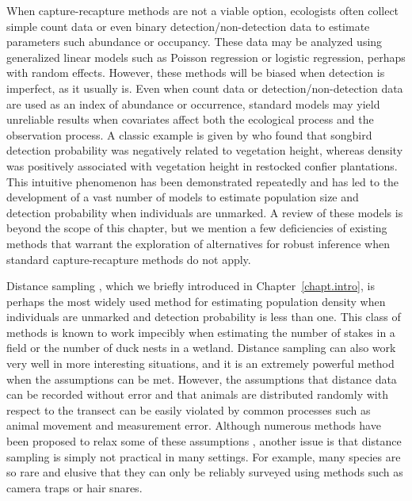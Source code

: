 When capture-recapture methods are not a viable option, ecologists
often collect simple count data or even binary detection/non-detection data
to estimate parameters such abundance or occupancy.
These
data may be analyzed using generalized linear models such as
Poisson regression or logistic regression, perhaps with random
effects. %
However, these methods will be biased when detection is imperfect, as
it usually is. Even when count data or detection/non-detection data are
used as an index of abundance or occurrence, standard models may yield
unreliable results when covariates affect both the ecological process
and the observation process. A classic example is given by
\citet{bibby_buckland:1987} who found that songbird detection
probability was negatively related to vegetation height, whereas
density was positively associated with vegetation height in restocked
confier plantations. This intuitive phenomenon has been
demonstrated repeatedly \citep[e.g.][]{kery:2008,sillett_etal:2012} and has led to the
development of a vast number of models to estimate population size and
detection probability when individuals are unmarked. A review of these
models is beyond the scope of this
chapter, but we mention a few deficiencies of existing methods
that warrant the exploration of alternatives for robust inference when
standard capture-recapture methods do not apply.

Distance sampling \citep{buckland_etal:2001}, which we briefly
introduced in Chapter~\ref{chapt.intro},
is perhaps the most widely used method for
estimating population density when individuals are unmarked and
detection probability is less than one. This class of methods is known
to work impecibly when estimating the number of stakes in a field or
the number of duck nests in a wetland. Distance sampling can also work very well in
more interesting situations, and it is an extremely powerful method when
the assumptions can be met. However, the assumptions that distance
data can be recorded without error and that animals are distributed
randomly with respect to the transect can be easily violated by
common processes such as animal movement and measurement
error. Although numerous methods have been proposed to
relax some of these assumptions
\citet{royle_etal:2004, borchers_etal:1998, johnson_etal:2010,
  chandler_etal:2011},
another issue is that distance
sampling is simply not practical in many settings. For example, many
species are so rare and elusive that they can only be reliably
surveyed using methods such as camera traps or hair snares. %

